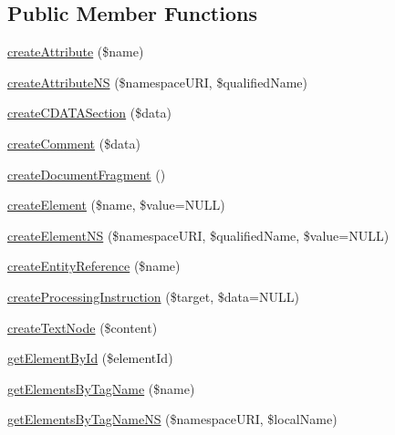 \subsection*{Public Member Functions}
\begin{DoxyCompactItemize}
\item 
\hyperlink{interface_able_polecat___dom___document_interface_a95a8661ef9b03ce670a3b193d459a667}{create\+Attribute} (\$name)
\item 
\hyperlink{interface_able_polecat___dom___document_interface_afc214fc8e5911368cc8e0377a1b2b20e}{create\+Attribute\+N\+S} (\$namespace\+U\+R\+I, \$qualified\+Name)
\item 
\hyperlink{interface_able_polecat___dom___document_interface_a8ee1b077d525d42ff433620320ffa43e}{create\+C\+D\+A\+T\+A\+Section} (\$data)
\item 
\hyperlink{interface_able_polecat___dom___document_interface_a5d7473192c918a49f87139678a9c0698}{create\+Comment} (\$data)
\item 
\hyperlink{interface_able_polecat___dom___document_interface_adee16a21cd2255f11de0a686d058be87}{create\+Document\+Fragment} ()
\item 
\hyperlink{interface_able_polecat___dom___document_interface_ade971bbc47ebf69388e18953164b2e7b}{create\+Element} (\$name, \$value=N\+U\+L\+L)
\item 
\hyperlink{interface_able_polecat___dom___document_interface_a603176eca3dd9fe0144195dd929d5084}{create\+Element\+N\+S} (\$namespace\+U\+R\+I, \$qualified\+Name, \$value=N\+U\+L\+L)
\item 
\hyperlink{interface_able_polecat___dom___document_interface_a9ebf6ac8ffb82d039f1bcd6c2e0c4ff6}{create\+Entity\+Reference} (\$name)
\item 
\hyperlink{interface_able_polecat___dom___document_interface_ad3fb9fe5a4f1d33bc246334d84cb83b4}{create\+Processing\+Instruction} (\$target, \$data=N\+U\+L\+L)
\item 
\hyperlink{interface_able_polecat___dom___document_interface_a9b040c658a1284d7b1931ea9f7cb57aa}{create\+Text\+Node} (\$content)
\item 
\hyperlink{interface_able_polecat___dom___document_interface_a9248e8c174d03acd54cb8e7fc7b966fb}{get\+Element\+By\+Id} (\$element\+Id)
\item 
\hyperlink{interface_able_polecat___dom___document_interface_a79196ad8273cd289455fc6781944d1f3}{get\+Elements\+By\+Tag\+Name} (\$name)
\item 
\hyperlink{interface_able_polecat___dom___document_interface_af20c7be087245f946ac72533fdd31501}{get\+Elements\+By\+Tag\+Name\+N\+S} (\$namespace\+U\+R\+I, \$local\+Name)

\end{DoxyCompactItemize}
